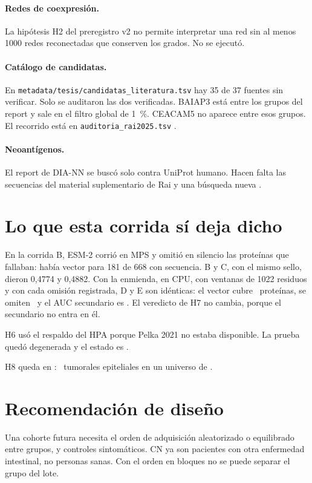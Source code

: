 \paragraph{Redes de coexpresión.}
La hipótesis H2 del preregistro v2 no permite interpretar una red sin al menos 1000 redes reconectadas que conserven los grados. No se ejecutó.

\paragraph{Catálogo de candidatas.}
En \texttt{metadata/tesis/candidatas\_literatura.tsv} hay 35 de 37 fuentes sin verificar. Solo se auditaron las dos verificadas. BAIAP3 está entre los grupos del report y sale en el filtro global de 1~\%. CEACAM5 no aparece entre esos grupos. El recorrido está en \texttt{auditoria\_rai2025.tsv} \cite{rai2025}.

\paragraph{Neoantígenos.}
El report de DIA-NN se buscó solo contra UniProt humano. Hacen falta las secuencias del material suplementario de Rai y una búsqueda nueva \cite{rai2025}.

\section{Lo que esta corrida sí deja dicho}

En la corrida B, ESM-2 corrió en MPS y omitió en silencio las proteínas que fallaban: había vector para 181 de 668 con secuencia. B y C, con el mismo sello, dieron 0,4774 y 0,4882. Con la enmienda, en CPU, con ventanas de 1022 residuos y con cada omisión registrada, D y E son idénticas: el vector cubre \HsieteNEsm\ proteínas, se omiten \HsieteOmitidas\ y el AUC secundario es \HsieteSec. El veredicto de H7 no cambia, porque el secundario no entra en él.

H6 usó el respaldo del HPA porque Pelka 2021 no estaba disponible. La prueba quedó degenerada y el estado es \HseisEstado.

H8 queda en \HochoEstado: \HochoTumorales\ tumorales epiteliales en un universo de \HochoUniverso.

\section{Recomendación de diseño}
Una cohorte futura necesita el orden de adquisición aleatorizado o equilibrado entre grupos, y controles sintomáticos. CN ya son pacientes con otra enfermedad intestinal, no personas sanas. Con el orden en bloques no se puede separar el grupo del lote.
